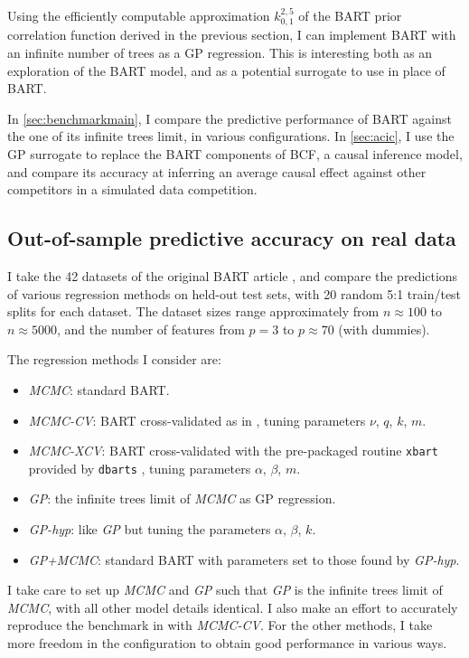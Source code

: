 \documentclass[a4paper]{article}
\theoremstyle{definition}
\begin{document}
    Using the efficiently computable approximation $k^{2,5}_{0,1}$ of the BART prior correlation function derived in the previous section, I can implement BART with an infinite number of trees as a GP regression. This is interesting both as an exploration of the BART model, and as a potential surrogate to use in place of BART.

    In \autoref{sec:benchmarkmain}, I compare the predictive performance of BART against the one of its infinite trees limit, in various configurations. In \autoref{sec:acic}, I use the GP surrogate to replace the BART components of BCF, a causal inference model, and compare its accuracy at inferring an average causal effect against other competitors in a simulated data competition.

    \subsection{Out-of-sample predictive accuracy on real data}
    \label{sec:benchmarkmain}

    I take the 42 datasets of the original BART article \autocite{chipman2010, kim2007}, and compare the predictions of various regression methods on held-out test sets, with 20 random 5:1 train/test splits for each dataset. The dataset sizes range approximately from $n\approx 100$ to $n\approx 5000$, and the number of features from $p=3$ to $p\approx 70$ (with dummies).

    The regression methods I consider are:
    \begin{itemize}
        \item \emph{MCMC}: standard BART.
        \item \emph{MCMC-CV}: BART cross-validated as in \textcite{chipman2010}, tuning parameters $\nu$, $q$, $k$, $m$.
        \item \emph{MCMC-XCV}: BART cross-validated with the pre-packaged routine \texttt{xbart} provided by \texttt{dbarts} \autocite{dorie2024}, tuning parameters $\alpha$, $\beta$, $m$.
        \item \emph{GP}: the infinite trees limit of \emph{MCMC} as GP regression.
        \item \emph{GP-hyp}: like \emph{GP} but tuning the parameters $\alpha$, $\beta$, $k$.
        \item \emph{GP+MCMC}: standard BART with parameters set to those found by \emph{GP-hyp}.
    \end{itemize}
    I take care to set up \emph{MCMC} and \emph{GP} such that \emph{GP} is the infinite trees limit of \emph{MCMC}, with all other model details identical. I also make an effort to accurately reproduce the benchmark in \textcite{chipman2010} with \emph{MCMC-CV}. For the other methods, I take more freedom in the configuration to obtain good performance in various ways.
\end{document}
